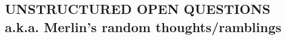 %
%
%


%




\subsection{UNSTRUCTURED OPEN QUESTIONS \\ a.k.a. Merlin's random thoughts/ramblings}\label{sec:calibQuestions}

